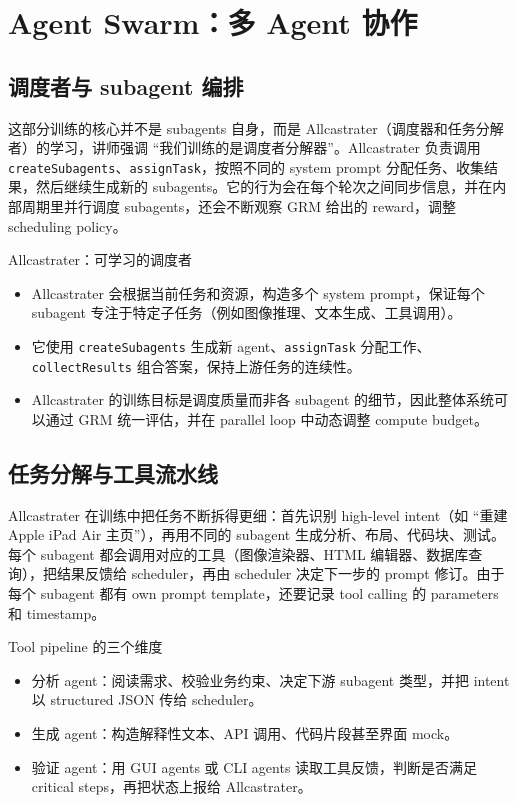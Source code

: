 \section{Agent Swarm：多 Agent 协作}

\subsection{调度者与 subagent 编排}
这部分训练的核心并不是 subagents 自身，而是 Allcastrater（调度器和任务分解者）的学习，讲师强调 ``我们训练的是调度者分解器''。Allcastrater 负责调用 \texttt{createSubagents}、\texttt{assignTask}，按照不同的 system prompt 分配任务、收集结果，然后继续生成新的 subagents。它的行为会在每个轮次之间同步信息，并在内部周期里并行调度 subagents，还会不断观察 GRM 给出的 reward，调整 scheduling policy。

\begin{knowledgebox}{Allcastrater：可学习的调度者}
\begin{itemize}
    \item Allcastrater 会根据当前任务和资源，构造多个 system prompt，保证每个 subagent 专注于特定子任务（例如图像推理、文本生成、工具调用）。
    \item 它使用 \texttt{createSubagents} 生成新 agent、\texttt{assignTask} 分配工作、\texttt{collectResults} 组合答案，保持上游任务的连续性。
    \item Allcastrater 的训练目标是调度质量而非各 subagent 的细节，因此整体系统可以通过 GRM 统一评估，并在 parallel loop 中动态调整 compute budget。
\end{itemize}
\end{knowledgebox}

\subsection{任务分解与工具流水线}
Allcastrater 在训练中把任务不断拆得更细：首先识别 high-level intent（如 ``重建 Apple iPad Air 主页''），再用不同的 subagent 生成分析、布局、代码块、测试。每个 subagent 都会调用对应的工具（图像渲染器、HTML 编辑器、数据库查询），把结果反馈给 scheduler，再由 scheduler 决定下一步的 prompt 修订。由于每个 subagent 都有 own prompt template，还要记录 tool calling 的 parameters 和 timestamp。

\begin{knowledgebox}{Tool pipeline 的三个维度}
\begin{itemize}
    \item 分析 agent：阅读需求、校验业务约束、决定下游 subagent 类型，并把 intent 以 structured JSON 传给 scheduler。
    \item 生成 agent：构造解释性文本、API 调用、代码片段甚至界面 mock。
    \item 验证 agent：用 GUI agents 或 CLI agents 读取工具反馈，判断是否满足 critical steps，再把状态上报给 Allcastrater。
\end{itemize}
\end{knowledgebox}

